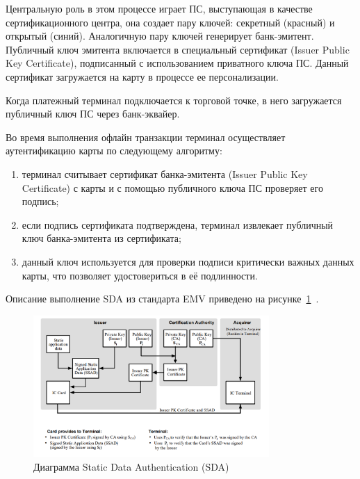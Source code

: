 Центральную роль в этом процессе играет ПС, выступающая в качестве сертификационного центра, она создает пару ключей: секретный (красный) и открытый (синий).
Аналогичную пару ключей генерирует банк-эмитент.
Публичный ключ эмитента включается в специальный сертификат (Issuer Public Key Certificate), подписанный с использованием приватного ключа ПС.
Данный сертификат загружается на карту в процессе ее персонализации.

Когда платежный терминал подключается к торговой точке, в него загружается публичный ключ ПС через банк-эквайер.

Во время выполнения офлайн транзакции терминал осуществляет аутентификацию карты по следующему алгоритму:

\begin{enumerate}
    \item терминал считывает сертификат банка-эмитента (Issuer Public Key Certificate) с карты и с помощью публичного ключа ПС проверяет его подпись;
    \item если подпись сертификата подтверждена, терминал извлекает публичный ключ банка-эмитента из сертификата;
    \item данный ключ используется для проверки подписи критически важных данных карты, что позволяет удостовериться в её подлинности.
\end{enumerate}


Описание выполнение SDA из стандарта EMV приведено на рисунке~\ref{fig:emv_offline_sda}~\cite{emv_book_2}.

\begin{figure}[H]
    \centering
    \includegraphics[width=0.8\textwidth]{images/research/emv_offline_sda}
    \caption{\centering Диаграмма Static Data Authentication (SDA)}
    \label{fig:emv_offline_sda}
\end{figure}


